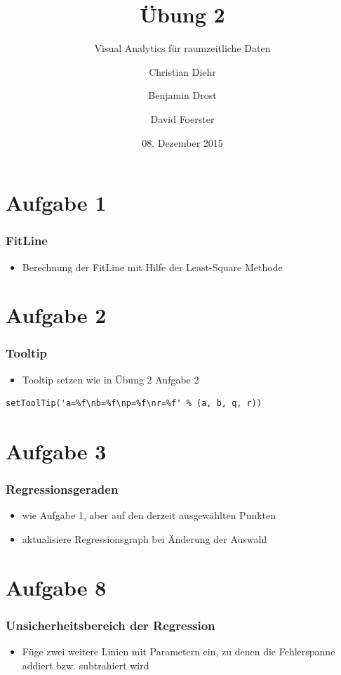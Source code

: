 \documentclass{beamer}
\title{Übung 2}
\subtitle{Visual Analytics für raumzeitliche Daten}
\author{Christian Diehr \and Benjamin Drost \and David Foerster}
\institute{Institut für Informatik\\Humboldt-Universität zu Berlin}
\date{08. Dezember 2015}
\begin{document}
    \begin{frame}
        \titlepage
    \end{frame}
    \logo %

    \section{Aufgabe 1}
    \begin{frame}
	    \frametitle{FitLine}
			\begin{itemize}
			\item Berechnung der FitLine mit Hilfe der Least-Square Methode
			\end{itemize}
    \end{frame}

    \section{Aufgabe 2}
    \begin{frame}[containsverbatim]
			\frametitle{Tooltip}
			\begin{itemize}
				\setlength\itemsep{1em}
				\item Tooltip setzen wie in Übung 2 Aufgabe 2
			\end{itemize}
			\begin{lstlisting}
setToolTip('a=%f\nb=%f\np=%f\nr=%f' % (a, b, q, r))
			\end{lstlisting}
    \end{frame}


    \section{Aufgabe 3}
    \begin{frame}
			\frametitle{Regressionsgeraden}
			\begin{itemize}
				\setlength\itemsep{1em}
				\item wie Aufgabe 1, aber auf den derzeit ausgewählten Punkten
				\item aktualisiere Regressionsgraph bei Änderung der Auswahl
			\end{itemize}
    \end{frame}



    \section{Aufgabe 8}
    \begin{frame}
			\frametitle{Unsicherheitsbereich der Regression}
			\begin{itemize}
				\item Füge zwei weitere Linien mit Parametern ein, zu denen die Fehlerspanne addiert bzw. subtrahiert wird
			\end{itemize}
    \end{frame}
\end{document}
